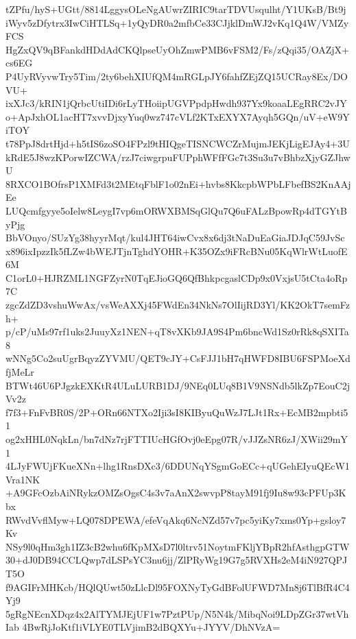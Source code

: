 tZPfu/hyS+UGtt/8814LggysOLeNgAUwrZIRIC9tarTDVUsqulht/Y1UKsB/Bt9j
iWyv5zDfytrx3IwCiHTLSq+1yQyDR0a2mfbCe33CJjklDmWJ2vKq1Q4W/VMZyFCS
HgZxQV9qBFankdHDdAdCKQlpseUyOhZmwPMB6vFSM2/Fs/zQqi35/OAZjX+cs6EG
P4UyRVyvwTry5Tim/2ty6behXIUfQM4mRGLpJY6fahfZEjZQ15UCRay8Ex/DOVU+
ixXJc3/kRIN1jQrbcUtiIDi6rLyTHoiipUGVPpdpHwdh937Yx9koaaLEgRRC2vJY
o+ApJxhOL1acHT7xvvDjxyYuq0wz747cVLf2KTxEXYX7Ayqh5GQn/uV+eW9YiTOY
t78PpJ8drtHjd+h5tIS6zoSO4FPzl9tHIQgeTISNCWCZrMujmJEKjLigEJAy4+3U
kRdE5J8wzKPorwIZCWA/rzJ7ciwgrpuFUPphWFfFGc7t3Su3u7vBhbzXjyGZJhwU
8RXCO1BOfrsP1XMFd3t2MEtqFblF1o02nEi+hvbs8KkcpbWPbLFbefBS2KnAAjEe
LUQcmfgyye5oIelw8LeygI7vp6mORWXBMSqGlQu7Q6uFALzBpowRp4dTGYtByPjg
BbVOnyo/SUzYg38hyyrMqt/kul4JHT64iwCvx8x6dj3tNaDuEaGiaJDJqC59JvSc
x896ixIpzzIk5fLZw4bWEJTjnTghdYOHR+K35OZx9iFRcBNu05KqWlrWtLuofE6M
C1orL0+HJRZML1NGFZyrN0TqEJioGQ6QfBhkpcgaslCDp9x0VxjsU5tCta4oRp7C
zgcZdZD3vshuWwAx/vsWeAXXj45FWdEn34NkNs7OlIijRD3Yl/KK2OkT7semFzh+
p/cP/uMs97rf1uks2JuuyXz1NEN+qT8vXKb9JA9S4Pm6bncWd1Sz0rRk8qSXITa8
wNNg5Co2suUgrBqyzZYVMU/QET9cJY+CsFJJ1bH7qHWFD8IBU6FSPMoeXdfjMeLr
BTWt46U6PJgzkEXKtR4ULuLURB1DJ/9NEq0LUq8B1V9NSNdb5lkZp7EouC2jVv2z
f7f3+FnFvBR0S/2P+ORn66NTXo2Iji3sI8KIByuQuWzJ7LJt1Rx+EcMB2mpbti51
og2xHHL0NqkLn/bn7dNz7rjFTTIUcHGfOvj0eEpg07R/vJJZsNR6zJ/XWii29mY1
4LJyFWUjFKueXNn+lhg1RnsDXc3/6DDUNqYSgmGoECc+qUGehEIyuQEcW1Vra1NK
+A9GFcOzbAiNRykzOMZsOgsC4s3v7aAnX2swvpP8tayM91fj9Iu8w93cPFUp3Kbx
RWvdVvflMyw+LQ078DPEWA/efeVqAkq6NcNZd57v7pc5yiKy7xms0Yp+gsloy7Kv
NSy9l0qHm3gh1IZ3cB2whu6fKpMXsD7l0ltrv51NoytmFKljYBpR2hfAsthgpGTW
30+dJ0DB94CCLQwp7dLSPsYC3nu6jj/ZlPRyWg19G7g5RVXHs2eM4iN927QPJT5O
f9AGIFrMHKcb/HQlQUwt50zLlcDl95FOXNyTyGdBFolUFWD7Mn8j6TlBfR4C4Yj9
5gRgNEcnXDqz4x2AlTYMJEjUF1w7PztPUp/N5N4k/MibqNoi9LDpZGr37wtVhIab
4BwRjJoKtf1iVLYE0TLVjimB2dBQXYu+JYYV/DhNVzA=

